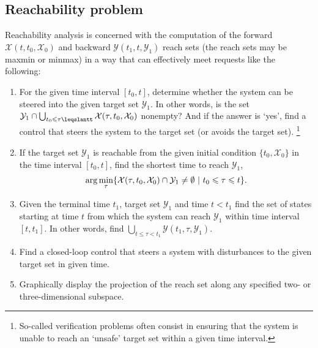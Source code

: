 \documentclass[letterpaper,10pt,english]{sphinxmanual}
\begin{document}
\subsection{Reachability problem}
\label{chap_reach:reachability-problem}
Reachability analysis is concerned with the computation of the forward
${\mathcal X}(t, t_0, {\mathcal X}_0)$ and backward
${\mathcal Y}(t_1, t, {\mathcal Y}_1)$ reach sets (the reach sets
may be maxmin or minmax) in a way that can effectively meet requests
like the following:
\begin{enumerate}
\item {} 
For the given time interval $[t_0, t]$, determine whether the
system can be steered into the given target set
${\mathcal Y}_1$. In other words, is the set
${\mathcal Y}_1\cap\bigcup_{t_0 \leqslant\tau\leqslantt}{\mathcal X}(\tau, t_0, {\mathcal X}_0)$
nonempty? And if the answer is ‘yes’, find a control that steers the
system to the target set (or avoids the target set). \footnote{
So-called verification problems often consist in ensuring that the
system is unable to reach an ‘unsafe’ target set within a given time
interval.
}

\item {} 
If the target set ${\mathcal Y}_1$ is reachable from the given
initial condition $\{t_0, {\mathcal X}_0\}$ in the time
interval $[t_0, t]$, find the shortest time to reach
${\mathcal Y}_1$,
\begin{gather}
\begin{split}\arg\min_{\tau}
\{{\mathcal X}(\tau,t_0,{\mathcal X}_0)\cap{\mathcal Y}_1\neq\emptyset ~|~ t_0\leqslant\tau\leqslant t\}.\end{split}\notag
\end{gather}
\item {} 
Given the terminal time $t_1$, target set
${\mathcal Y}_1$ and time $t<t_1$ find the set of states
starting at time $t$ from which the system can reach
${\mathcal Y}_1$ within time interval $[t, t_1]$. In
other words, find
$\bigcup_{t\leqslant\tau<t_1}{\mathcal Y}(t_1, \tau, {\mathcal Y}_1)$.

\item {} 
Find a closed-loop control that steers a system with disturbances to
the given target set in given time.

\item {} 
Graphically display the projection of the reach set along any
specified two- or three-dimensional subspace.

\end{enumerate}
\end{document}
